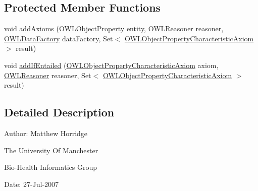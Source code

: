 \subsection*{Protected Member Functions}
\begin{DoxyCompactItemize}
\item 
void \hyperlink{classorg_1_1semanticweb_1_1owlapi_1_1util_1_1_inferred_object_property_characteristic_axiom_generator_a6233317439167ced5faafaa10db55531}{add\-Axioms} (\hyperlink{interfaceorg_1_1semanticweb_1_1owlapi_1_1model_1_1_o_w_l_object_property}{O\-W\-L\-Object\-Property} entity, \hyperlink{interfaceorg_1_1semanticweb_1_1owlapi_1_1reasoner_1_1_o_w_l_reasoner}{O\-W\-L\-Reasoner} reasoner, \hyperlink{interfaceorg_1_1semanticweb_1_1owlapi_1_1model_1_1_o_w_l_data_factory}{O\-W\-L\-Data\-Factory} data\-Factory, Set$<$ \hyperlink{interfaceorg_1_1semanticweb_1_1owlapi_1_1model_1_1_o_w_l_object_property_characteristic_axiom}{O\-W\-L\-Object\-Property\-Characteristic\-Axiom} $>$ result)
\item 
void \hyperlink{classorg_1_1semanticweb_1_1owlapi_1_1util_1_1_inferred_object_property_characteristic_axiom_generator_a2a4188703cbaf51e7f5763ec13a837b1}{add\-If\-Entailed} (\hyperlink{interfaceorg_1_1semanticweb_1_1owlapi_1_1model_1_1_o_w_l_object_property_characteristic_axiom}{O\-W\-L\-Object\-Property\-Characteristic\-Axiom} axiom, \hyperlink{interfaceorg_1_1semanticweb_1_1owlapi_1_1reasoner_1_1_o_w_l_reasoner}{O\-W\-L\-Reasoner} reasoner, Set$<$ \hyperlink{interfaceorg_1_1semanticweb_1_1owlapi_1_1model_1_1_o_w_l_object_property_characteristic_axiom}{O\-W\-L\-Object\-Property\-Characteristic\-Axiom} $>$ result)
\end{DoxyCompactItemize}


\subsection{Detailed Description}
Author\-: Matthew Horridge\par
 The University Of Manchester\par
 Bio-\/\-Health Informatics Group\par
 Date\-: 27-\/\-Jul-\/2007\par
\par
 

